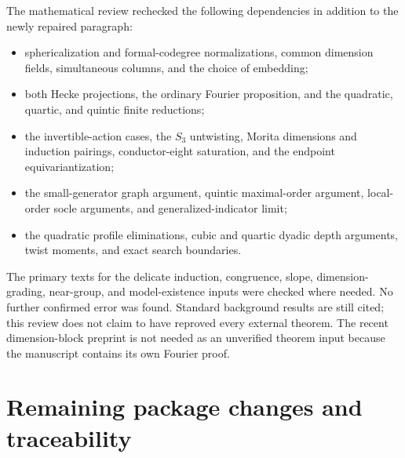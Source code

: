 \documentclass[11pt,a4paper]{article}
\begin{document}
The mathematical review rechecked the following dependencies in
addition to the newly repaired paragraph:
\begin{itemize}
\item sphericalization and formal-codegree normalizations, common
dimension fields, simultaneous columns, and the choice of embedding;
\item both Hecke projections, the ordinary Fourier proposition, and
the quadratic, quartic, and quintic finite reductions;
\item the invertible-action cases, the $S_3$ untwisting, Morita
dimensions and induction pairings, conductor-eight saturation, and
the endpoint equivariantization;
\item the small-generator graph argument, quintic maximal-order
argument, local-order socle arguments, and generalized-indicator limit;
\item the quadratic profile eliminations, cubic and quartic dyadic
depth arguments, twist moments, and exact search boundaries.
\end{itemize}
The primary texts for the delicate induction, congruence, slope,
dimension-grading, near-group, and model-existence inputs were checked
where needed. No further confirmed error was found. Standard background
results are still cited; this review does not claim to have reproved
every external theorem. The recent dimension-block preprint is not
needed as an unverified theorem input because the manuscript contains
its own Fourier proof.

\section{Remaining package changes and traceability}
\end{document}
